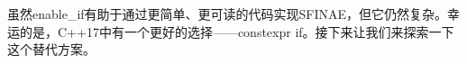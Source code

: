 虽然enable\_if有助于通过更简单、更可读的代码实现SFINAE，但它仍然复杂。幸运的是，C++17中有一个更好的选择——constexpr if。接下来让我们来探索一下这个替代方案。


































